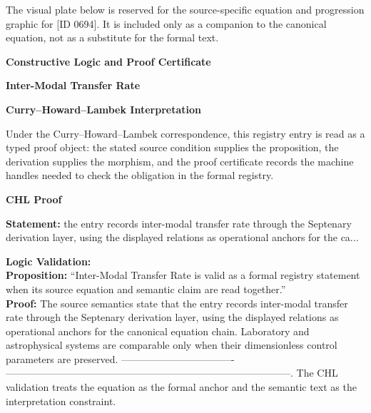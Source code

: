 \begingroup\footnotesize\sloppy
The visual plate below is reserved for the source-specific equation and progression graphic for [ID 0694]. It is included only as a companion to the canonical equation, not as a substitute for the formal text.
\par\endgroup
\ifTZPDarkEdition
{}
\fi

\clearpage
\begingroup\tzpsupportsetup
\noindent\textbf{\fontsize{10.8pt}{12.8pt}\selectfont [ID 0694] Constructive Logic and Proof Certificate}\par
\noindent\textbf{\fontsize{10pt}{12pt}\selectfont Inter-Modal Transfer Rate}\par
\vspace{0.45em}
\begingroup
\footnotesize
\setlength{\parskip}{0.22em}
\setlength{\parindent}{0pt}
\noindent\textbf{Curry--Howard--Lambek Interpretation}\par
Under the Curry--Howard--Lambek correspondence, this registry entry is read as a typed proof
object: the stated source condition supplies the proposition, the derivation supplies the
morphism, and the proof certificate records the machine handles needed to check the obligation
in the formal registry.

\vspace{0.45em}
\noindent\textbf{CHL Proof}\par
\textbf{Statement:} the entry records inter-modal transfer rate through the Septenary derivation layer,
using the displayed relations as operational anchors for the ca...

\textbf{Logic Validation:}\\
\textbf{Proposition:} ``Inter-Modal Transfer Rate is valid as a formal registry statement when its source
equation and semantic claim are read together.''\\
\textbf{Proof:} The source semantics state that the entry records inter-modal transfer rate through the
Septenary derivation layer, using the displayed relations as operational anchors for the
canonical equation chain. Laboratory and astrophysical systems are comparable only when
their dimensionless control parameters are preserved. ----------------------------------
--------------------------------------------------------------------------------------.
The CHL validation treats the equation as the formal anchor and the semantic text as the
interpretation constraint.

